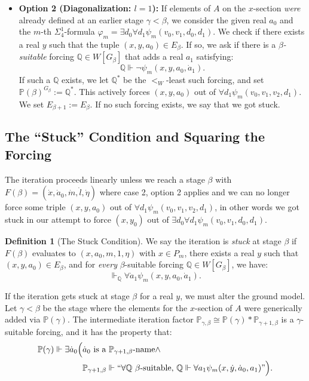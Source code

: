 \documentclass{article}
\theoremstyle{plain}
\theoremstyle{definition}
\newtheorem{definition}[theorem]{Definition}
\newcommand{\forces}{\Vdash}
\newcommand{\forceP}{\mathbb{P}}
\newcommand{\forceQ}{\mathbb{Q}}
\begin{document}
\begin{enumerate}
\begin{itemize}
        
        \item \textbf{Option 2 (Diagonalization: $l = 1$):} If elements of $A$ on the $x$-section \emph{were} already defined at an earlier stage $\gamma < \beta$, we consider the given real $a_0$ and the $m$-th $\Sigma^1_4$-formula $\varphi_m = \exists d_0 \forall d_1 \psi_m (v_0,v_1,d_0,d_1)$. We check if there exists a real $y$ such that the tuple $(x, y, a_0) \in E_\beta$. If so, we ask if there is a \emph{$\beta$-suitable} forcing $\forceQ \in W[G_\beta]$ that adds a real $a_1$ satisfying:
        \[ \forceQ \forces \neg\psi_m(x, y, a_0, \dot{a}_1). \]
        If such a $\forceQ$ exists, we let $\forceQ^*$ be the $<_W$-least such forcing, and set $\forceP(\beta)^{G_\beta} := \forceQ^*$. This actively forces $(x, y,a_0)$ out of $\forall d_1 \psi_m(v_0,v_1,v_2,d_1)$. We set $E_{\beta+1} := E_\beta$. {If no such forcing exists, we say that  we got stuck.}
    \end{itemize}
\end{enumerate}

\subsection{The ``Stuck'' Condition and Squaring the Forcing}
The iteration proceeds linearly unless we reach a stage $\beta$ with $F(\beta)= (\dot{x},\dot{a}_0,\dot{m},\dot{l}, \dot{\eta})$ where case 2, option 2 applies and we can no longer force some triple $(x, y,a_0)$ out of $\forall d_1 \psi_m(v_0,v_1,v_2,d_1)$, in other words we got stuck in our attempt to force $(x,y_0)$ out of $\exists d_0 \forall d_1 \psi_m (v_0,v_1,d_0,d_1)$.

\begin{definition}[The Stuck Condition]
We say the iteration is \emph{stuck} at stage $\beta$ if $F(\beta)$ evaluates to $(x, a_0, m, 1, \eta)$ with $x \in P_m$, there exists a real $y$ such that $(x, y, a_0) \in E_\beta$, and for \emph{every} $\beta$-suitable forcing $\mathbb{Q} \in W[G_\beta]$, we have:
\[ \Vdash_{\mathbb{Q}} \forall \dot{a}_1 \psi_m(x, y, a_0, \dot{a}_1). \]
\end{definition}

If the iteration gets stuck at stage $\beta$ for a real $y$, we must alter the ground model. Let $\gamma < \beta$ be the stage where the elements for the $x$-section of $A$  were generically added via $\mathbb{P}(\gamma)$. The intermediate iteration factor $\mathbb{P}_{\gamma, \beta} \cong \mathbb{P}(\gamma) \ast \mathbb{P}_{\gamma+1, \beta}$ is a $\gamma$-suitable forcing, and it has the property that:
\begin{align*}
   \mathbb{P}(\gamma) \Vdash \exists \dot{a}_0 \Big(& \dot{a}_0 \text{ is a } \mathbb{P}_{\gamma+1, \beta}\text{-name} \land \\& \forceP_{\gamma+1,\beta} \Vdash ``\forall \mathbb{Q} \text{ } \beta\text{-suitable, } \mathbb{Q} \Vdash \forall a_1 \psi_m(x, \dot{y}, \dot{a}_0, a_1)" \Big). 
\end{align*}
\end{document}
